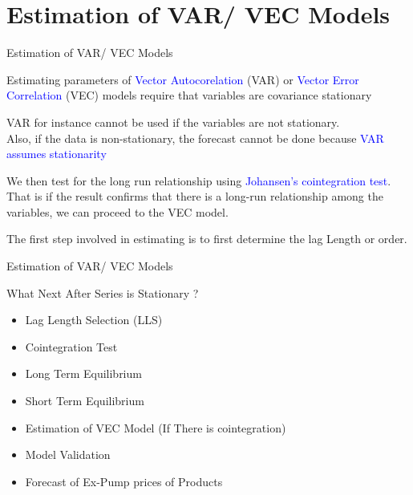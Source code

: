\documentclass{beamer}
\newcommand{\vspaceFive}{\vspace{5pt}}
\newcommand{\textHighlight}[1]{\textcolor{blue}{#1}}
\newcommand{\VARHighlight}{\textHighlight{Vector Autocorelation }}
\newcommand{\VECHighlight}{\textHighlight{Vector Error Correlation }}
\begin{document}
	\section{Estimation of VAR/ VEC Models}
	\begin{frame}{Estimation of VAR/ VEC Models}
		\begin{block}{}
			Estimating parameters of \VARHighlight (VAR) or \VECHighlight (VEC) models require that variables are 
			covariance stationary \vspaceFive
		\end{block} \vspaceFive
		
		\begin{block}{}
			VAR for instance cannot be used if the variables are not stationary. \\
			Also, if the data is non-stationary, the forecast cannot be done because \textHighlight{VAR assumes stationarity}
		\end{block}
	
		\begin{block}{}
			We then test for the long run relationship using \textHighlight{Johansen’s cointegration test}.  \\
			That is if the result confirms that there is a long-run relationship among the variables, 
			we can proceed to the VEC model. 
		\end{block}
	
		\begin{exampleblock}{}
			The first step involved in estimating is to first determine the lag Length or order. 
		\end{exampleblock}
	\end{frame}

	\begin{frame}{Estimation of VAR/ VEC Models }
		
		\begin{block}{What Next After Series is Stationary ?}
			\vspaceFive
			\begin{itemize}[label=$\diamond$, leftmargin=2em, itemsep=1em]
				\item Lag Length Selection (LLS)
				\item Cointegration Test
				\item Long Term Equilibrium
				\item Short Term Equilibrium
				\item Estimation of VEC Model (If There is cointegration)
				\item Model Validation
				\item Forecast of Ex-Pump prices of Products
			\end{itemize}
			\vspaceFive
		\end{block}
		
	\end{frame}
\end{document}
